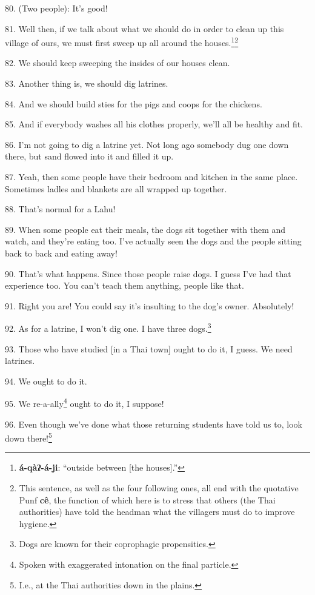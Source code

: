 80. (Two people): It's good!

81. Well then, if we talk about what we should do in order to clean up this village
of ours, we must first sweep up all around the houses.\footnote{\textbf{á-qàʔ-á-ji}: ``outside between [the houses].''}\footnote{This sentence, as well as the four following ones, all end with the quotative Punf \textbf{cê}, the function of which here is to stress that others (the Thai authorities) have told the headman what the villagers must do to improve hygiene.}

82. We should keep sweeping the insides of our houses clean.

83. Another thing is, we should dig latrines.

84. And we should build sties for the pigs and coops for the chickens.

85. And if everybody washes all his clothes properly, we'll all be healthy and
fit.

86. I'm not going to dig a latrine yet. Not long ago somebody dug one down there,
but sand flowed into it and filled it up.

87. Yeah, then some people have their bedroom and kitchen in the same place. Sometimes
ladles and blankets are all wrapped up together.

88. That's normal for a Lahu! 

89. When some people eat their meals, the dogs sit together with them and watch,
and they're eating too. I've actually seen the dogs and the people sitting back
to back and eating away!

90. That's what happens. Since those people raise dogs. I guess I've had that experience
too. You can't teach them anything, people like that.

91. Right you are! You could say it's insulting to the dog's owner. Absolutely!

92. As for a latrine, I won't dig one. I have three dogs.\footnote{Dogs are known for their coprophagic propensities.}


93. Those who have studied [in a Thai town] ought to do it, I guess. We need latrines.

94. We ought to do it.

95. We re-a-ally\footnote{Spoken with exaggerated intonation on the final particle.} ought to do it, I suppose!

96. Even though we've done what those returning students have told us to, look
down there!\footnote{I.e., at the Thai authorities down in the plains.}

